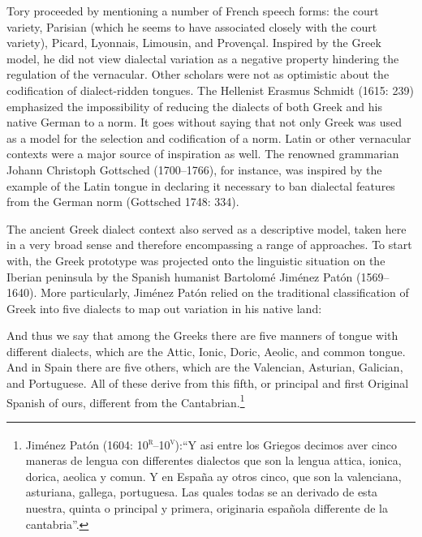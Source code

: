 \begin{styleStandard}
Tory proceeded by mentioning a number of French speech forms: the court variety, Parisian (which he seems to have associated closely with the court variety), Picard, Lyonnais, Limousin, and Provençal. Inspired by the Greek model, he did not view dialectal variation as a negative property hindering the regulation of the vernacular. Other scholars were not as optimistic about the codification of dialect-ridden tongues. The Hellenist Erasmus Schmidt (1615: 239) emphasized the impossibility of reducing the dialects of both Greek and his native German to a norm. It goes without saying that not only Greek was used as a model for the selection and codification of a norm. Latin or other vernacular contexts were a major source of inspiration as well. The renowned grammarian Johann Christoph Gottsched (1700–1766), for instance, was inspired by the example of the Latin tongue in declaring it necessary to ban dialectal features from the German norm (Gottsched 1748: 334).
\end{styleStandard}

\begin{styleStandard}
The ancient Greek dialect context also served as a descriptive model, taken here in a very broad sense and therefore encompassing a range of approaches. To start with, the Greek prototype was projected onto the linguistic situation on the Iberian peninsula by the Spanish humanist Bartolomé Jiménez Patón (1569–1640). More particularly, Jiménez Patón relied on the traditional classification of Greek into five dialects to map out variation in his native land:
\end{styleStandard}

\begin{styleQuote}
And thus we say that among the Greeks there are five manners of tongue with different dialects, which are the Attic, Ionic, Doric, Aeolic, and common tongue. And in Spain there are five others, which are the Valencian, Asturian, Galician, and Portuguese. All of these derive from this fifth, or principal and first Original Spanish of ours, different from the Cantabrian.\footnote{ Jiménez Patón (1604: 10\textsc{\textsuperscript{r}}\textsc{–10}\textsc{\textsuperscript{v}}):“Y asi entre los Griegos decimos aver cinco maneras de lengua con differentes dialectos que son la lengua attica, ionica, dorica, aeolica y comun. Y en España ay otros cinco, que son la valenciana, asturiana, gallega, portuguesa. Las quales todas se an derivado de esta nuestra, quinta o principal y primera, originaria española differente de la cantabria”.}
\end{styleQuote}

